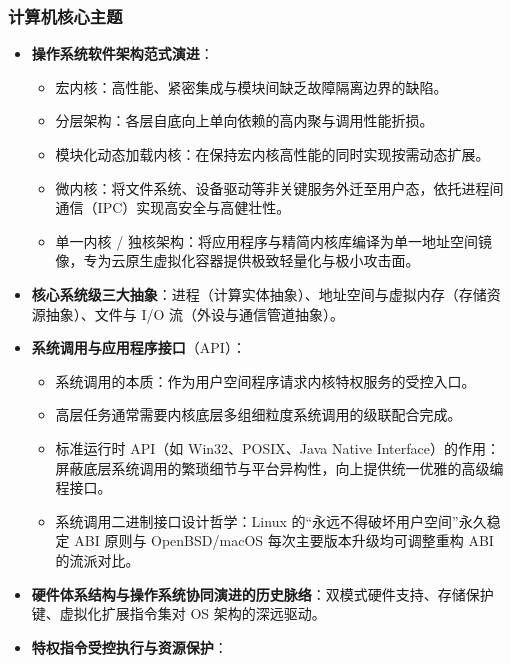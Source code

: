 \subsubsection{计算机核心主题}
\begin{itemize}\setlength{\itemsep}{0pt}\setlength{\parskip}{0pt}
    \item \textbf{操作系统软件架构范式演进}：
    \begin{itemize}\setlength{\itemsep}{0pt}\setlength{\parskip}{0pt}
        \item 宏内核：高性能、紧密集成与模块间缺乏故障隔离边界的缺陷。
        \item 分层架构：各层自底向上单向依赖的高内聚与调用性能折损。
        \item 模块化动态加载内核：在保持宏内核高性能的同时实现按需动态扩展。
        \item 微内核：将文件系统、设备驱动等非关键服务外迁至用户态，依托进程间通信（IPC）实现高安全与高健壮性。
        \item 单一内核 / 独核架构：将应用程序与精简内核库编译为单一地址空间镜像，专为云原生虚拟化容器提供极致轻量化与极小攻击面。
    \end{itemize}
    \item \textbf{核心系统级三大抽象}：进程（计算实体抽象）、地址空间与虚拟内存（存储资源抽象）、文件与 I/O 流（外设与通信管道抽象）。
    \item \textbf{系统调用与应用程序接口}（API）：
    \begin{itemize}\setlength{\itemsep}{0pt}\setlength{\parskip}{0pt}
        \item 系统调用的本质：作为用户空间程序请求内核特权服务的受控入口。
        \item 高层任务通常需要内核底层多组细粒度系统调用的级联配合完成。
        \item 标准运行时 API（如 Win32、POSIX、Java Native Interface）的作用：屏蔽底层系统调用的繁琐细节与平台异构性，向上提供统一优雅的高级编程接口。
        \item 系统调用二进制接口设计哲学：Linux 的“永远不得破坏用户空间”永久稳定 ABI 原则与 OpenBSD/macOS 每次主要版本升级均可调整重构 ABI 的流派对比。
    \end{itemize}
    \item \textbf{硬件体系结构与操作系统协同演进的历史脉络}：双模式硬件支持、存储保护键、虚拟化扩展指令集对 OS 架构的深远驱动。
    \item \textbf{特权指令受控执行与资源保护}：
    \begin{itemize}\setlength{\itemsep}{0pt}\setlength{\parskip}{0pt}

\end{itemize}
\end{itemize}

